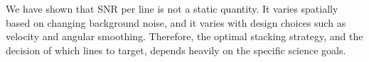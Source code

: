 We have shown that SNR per line is not a static quantity. It varies spatially based on changing background noise, and it varies with design choices such as velocity and angular smoothing. Therefore, the optimal stacking strategy, and the decision of which lines to target, depends heavily on the specific science goals.